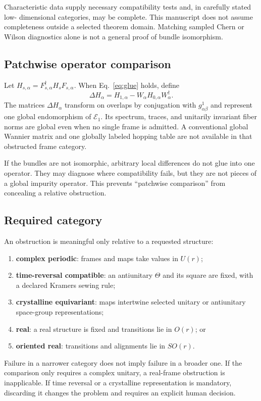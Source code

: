 \documentclass[11pt]{article}
\newenvironment{prospective}{\color{prospectivered}}{}
\begin{document}
\begin{prospective}
Characteristic data supply necessary compatibility tests and, in carefully stated low-
dimensional categories, may be complete. This manuscript does not assume completeness
outside a selected theorem domain. Matching sampled Chern or Wilson diagnostics alone is
not a general proof of bundle isomorphism.

\subsection{Patchwise operator comparison}
Let $H_{s,\alpha}=F_{s,\alpha}^\dagger H_sF_{s,\alpha}$. When Eq.~\eqref{eq:glue} holds,
define
\begin{equation}
 \Delta H_\alpha
 =H_{1,\alpha}-W_\alpha H_{0,\alpha}W_\alpha^\dagger.
\end{equation}
The matrices $\Delta H_\alpha$ transform on overlaps by conjugation with
$g^1_{\alpha\beta}$ and represent one global endomorphism of $\mathcal E_1$. Its
spectrum, traces, and unitarily invariant fiber norms are global even when no single
frame is admitted. A conventional global Wannier matrix and one globally labeled hopping
table are not available in that obstructed frame category.

If the bundles are not isomorphic, arbitrary local differences do not glue into one
operator. They may diagnose where compatibility fails, but they are not pieces of a
global impurity operator. This prevents ``patchwise comparison'' from concealing a
relative obstruction.

\subsection{Required category}
An obstruction is meaningful only relative to a requested structure:
\begin{enumerate}
 \item \textbf{complex periodic}: frames and maps take values in $U(r)$;
 \item \textbf{time-reversal compatible}: an antiunitary $\Theta$ and its square are
 fixed, with a declared Kramers sewing rule;
 \item \textbf{crystalline equivariant}: maps intertwine selected unitary or antiunitary
 space-group representations;
 \item \textbf{real}: a real structure is fixed and transitions lie in $O(r)$; or
 \item \textbf{oriented real}: transitions and alignments lie in $SO(r)$.
\end{enumerate}
Failure in a narrower category does not imply failure in a broader one. If the comparison
only requires a complex unitary, a real-frame obstruction is inapplicable. If time
reversal or a crystalline representation is mandatory, discarding it changes the
problem and requires an explicit human decision.


\end{prospective}
\end{document}
